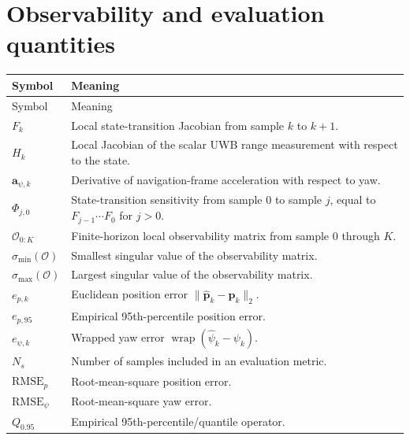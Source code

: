\section*{Observability and evaluation quantities}
\begin{longtable}{p{}p{}}
\toprule
Symbol & Meaning\\
\midrule
\endfirsthead
\toprule
Symbol & Meaning\\
\midrule
\endhead
$F_k$ & Local state-transition Jacobian from sample $k$ to $k+1$.\\
$H_k$ & Local Jacobian of the scalar UWB range measurement with respect to the state.\\
$\bm{a}_{\psi,k}$ & Derivative of navigation-frame acceleration with respect to yaw.\\
$\Phi_{j,0}$ & State-transition sensitivity from sample $0$ to sample $j$, equal to $F_{j-1}\cdots F_0$ for $j>0$.\\
$\mathcal{O}_{0:K}$ & Finite-horizon local observability matrix from sample $0$ through $K$.\\
$\sigma_{\min}(\mathcal{O})$ & Smallest singular value of the observability matrix.\\
$\sigma_{\max}(\mathcal{O})$ & Largest singular value of the observability matrix.\\
$e_{p,k}$ & Euclidean position error $\lVert\hat{\bm{p}}_k-\bm{p}_k\rVert_2$.\\
$e_{p,95}$ & Empirical 95th-percentile position error.\\
$e_{\psi,k}$ & Wrapped yaw error $\operatorname{wrap}(\hat\psi_k-\psi_k)$.\\
$N_s$ & Number of samples included in an evaluation metric.\\
$\mathrm{RMSE}_p$ & Root-mean-square position error.\\
$\mathrm{RMSE}_{\psi}$ & Root-mean-square yaw error.\\
$Q_{0.95}$ & Empirical 95th-percentile/quantile operator.\\
\bottomrule
\end{longtable}

